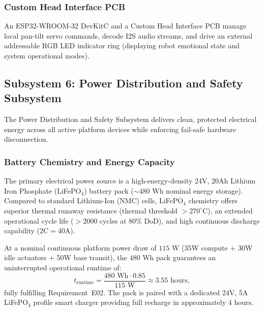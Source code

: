 \subsubsection{Custom Head Interface PCB}
An ESP32-WROOM-32 DevKitC and a Custom Head Interface PCB manage local pan-tilt servo commands, decode I2S audio streams, and drive an external addressable RGB LED indicator ring (displaying robot emotional state and system operational modes).

\subsection{Subsystem 6: Power Distribution and Safety Subsystem}
\label{subsec:subsystem_6_power}
The Power Distribution and Safety Subsystem delivers clean, protected electrical energy across all active platform devices while enforcing fail-safe hardware disconnection.

\subsubsection{Battery Chemistry and Energy Capacity}
The primary electrical power source is a high-energy-density 24V, 20Ah Lithium Iron Phosphate (LiFePO$_4$) battery pack ($\sim 480\text{ Wh}$ nominal energy storage). Compared to standard Lithium-Ion (NMC) cells, LiFePO$_4$ chemistry offers superior thermal runaway resistance (thermal threshold $>270^\circ\text{C}$), an extended operational cycle life ($>2000$ cycles at $80\%$ DoD), and high continuous discharge capability ($2\text{C} = 40\text{A}$). 

At a nominal continuous platform power draw of $115\text{ W}$ (35W compute + 30W idle actuators + 50W base transit), the $480\text{ Wh}$ pack guarantees an uninterrupted operational runtime of:
\begin{equation}
  t_{\text{runtime}} = \frac{480\text{ Wh} \cdot 0.85}{115\text{ W}} \approx 3.55\text{ hours},
\end{equation}
fully fulfilling Requirement~E02. The pack is paired with a dedicated 24V, 5A LiFePO$_4$ profile smart charger providing full recharge in approximately $4\text{ hours}$.

